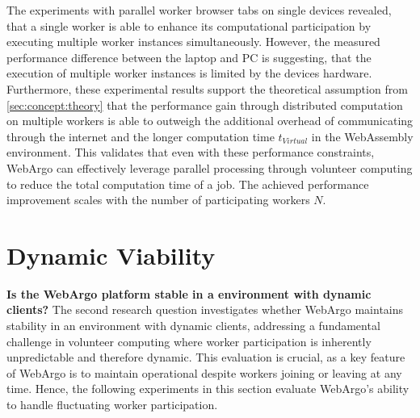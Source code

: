 The experiments with parallel worker browser tabs on single devices revealed, that a single worker is able to enhance its computational participation by executing multiple worker instances simultaneously. However, the measured performance difference between the laptop and \acs{PC} is suggesting, that the execution of multiple worker instances is limited by the devices hardware.
~\\
Furthermore, these experimental results support the theoretical assumption from \autoref{sec:concept:theory} that the performance gain through distributed computation on multiple workers is able to outweigh the additional overhead of communicating through the internet and the longer computation time $t_{Virtual}$ in the WebAssembly environment. This validates that even with these performance constraints, WebArgo can effectively leverage parallel processing through volunteer computing to reduce the total computation time of a job. The achieved performance improvement scales with the number of participating workers $N$.

\section{Dynamic Viability}
\label{sec:evaluation:dynamic}
\textbf{Is the WebArgo platform stable in a environment with dynamic clients?}
\newline
The second research question investigates whether WebArgo maintains stability in an environment with dynamic clients, addressing a fundamental challenge in volunteer computing where worker participation is inherently unpredictable and therefore dynamic. This evaluation is crucial, as a key feature of WebArgo is to maintain operational despite workers joining or leaving at any time. Hence, the following experiments in this section evaluate WebArgo's ability to handle fluctuating worker participation.


